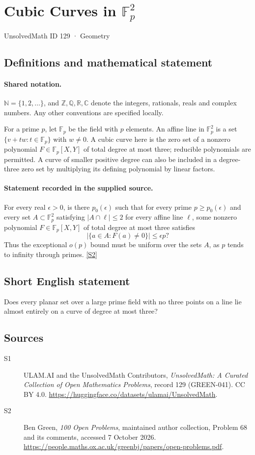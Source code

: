 \documentclass[11pt]{article}
\newcommand{\sref}[2]{\hyperlink{source:#1:#2}{[S#2]}}
\begin{document}
\setcounter{section}{128}
\section{Cubic Curves in $\mathbb F_p^2$}\label{129}
{\small\sffamily UnsolvedMath ID 129 · Geometry}
\subsection{Definitions and mathematical statement}

\paragraph{Shared notation.}$\mathbb N=\{1,2,\ldots\}$, and $\mathbb Z,\mathbb Q,\mathbb R,\mathbb C$ denote the integers, rationals, reals and complex numbers. Any other conventions are specified locally.


For a prime $p$, let $\mathbb F_p$ be the field with $p$ elements. An affine line in $\mathbb F_p^2$ is a set $\{v+t w:t\in\mathbb F_p\}$ with $w\ne0$. A cubic curve here is the zero set of a nonzero polynomial $F\in\mathbb F_p[X,Y]$ of total degree at most three; reducible polynomials are permitted. A curve of smaller positive degree can also be included in a degree-three zero set by multiplying its defining polynomial by linear factors.
\paragraph{Statement recorded in the supplied source.}
For every real $\epsilon>0$, is there $p_0(\epsilon)$ such that for every prime $p\geq p_0(\epsilon)$ and every set $A\subset\mathbb F_p^2$ satisfying $|A\cap\ell|\leq2$ for every affine line $\ell$, some nonzero polynomial $F\in\mathbb F_p[X,Y]$ of total degree at most three satisfies
\[
 |\{a\in A:F(a)\ne0\}|\leq\epsilon p?
\]
Thus the exceptional $o(p)$ bound must be uniform over the sets $A$, as $p$ tends to infinity through primes. \sref{129}{2}
\subsection{Short English statement}
Does every planar set over a large prime field with no three points on a line lie almost entirely on a curve of degree at most three?
\subsection{Sources}
\begin{description}
\item[\hypertarget{source:129:1}{S1}] ULAM.AI and the UnsolvedMath Contributors, \emph{UnsolvedMath: A Curated Collection of Open Mathematics Problems}, record 129 (GREEN-041). CC BY 4.0. \url{https://huggingface.co/datasets/ulamai/UnsolvedMath}.
\item[\hypertarget{source:129:2}{S2}] Ben Green, \emph{100 Open Problems}, maintained author collection, Problem 68 and its comments, accessed 7 October 2026. \url{https://people.maths.ox.ac.uk/greenbj/papers/open-problems.pdf}.
\end{description}
\label{end:129}
\end{document}
